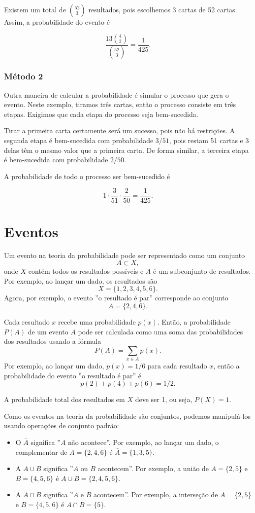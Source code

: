 Existem um total de ${52 \choose 3}$ resultados,
pois escolhemos 3 cartas de 52 cartas.
Assim, a probabilidade do evento é

\[\frac{13 {4 \choose 3}}{{52 \choose 3}} = \frac{1}{425}.\]

\subsubsection*{Método 2}

Outra maneira de calcular a probabilidade é
simular o processo que gera o evento.
Neste exemplo, tiramos três cartas, então o processo
consiste em três etapas.
Exigimos que cada etapa do processo seja bem-sucedida.

Tirar a primeira carta certamente será um sucesso,
pois não há restrições.
A segunda etapa é bem-sucedida com probabilidade $3/51$,
pois restam 51 cartas e 3 delas
têm o mesmo valor que a primeira carta.
De forma similar, a terceira etapa é bem-sucedida com probabilidade $2/50$.

A probabilidade de todo o processo ser bem-sucedido é

\[1 \cdot \frac{3}{51} \cdot \frac{2}{50} = \frac{1}{425}.\]

\section{Eventos}

Um evento na teoria da probabilidade pode ser representado como um conjunto
\[A \subset X,\]
onde $X$ contém todos os resultados possíveis
e $A$ é um subconjunto de resultados.
Por exemplo, ao lançar um dado, os resultados são
\[X = \{1,2,3,4,5,6\}.\]
Agora, por exemplo, o evento ''o resultado é par''
corresponde ao conjunto
\[A = \{2,4,6\}.\]

Cada resultado $x$ recebe uma probabilidade $p(x)$.
Então, a probabilidade $P(A)$ de um evento
$A$ pode ser calculada como uma soma
das probabilidades dos resultados usando a fórmula
\[P(A) = \sum_{x \in A} p(x).\]
Por exemplo, ao lançar um dado,
$p(x)=1/6$ para cada resultado $x$,
então a probabilidade do evento
''o resultado é par'' é
\[p(2)+p(4)+p(6)=1/2.\]

A probabilidade total dos resultados em $X$ deve
ser 1, ou seja, $P(X)=1$.

Como os eventos na teoria da probabilidade são conjuntos,
podemos manipulá-los usando operações de conjunto padrão:

\begin{itemize}
\item O  $\bar A$ significa
''$A$ não acontece''.
Por exemplo, ao lançar um dado,
o complementar de $A=\{2,4,6\}$ é
$\bar A = \{1,3,5\}$.
\item A  $A \cup B$ significa
''$A$ ou $B$ acontecem''.
Por exemplo, a união de
$A=\{2,5\}$
e $B=\{4,5,6\}$ é
$A \cup B = \{2,4,5,6\}$.
\item A  $A \cap B$ significa
''$A$ e $B$ acontecem''.
Por exemplo, a interseção de
$A=\{2,5\}$ e $B=\{4,5,6\}$ é
$A \cap B = \{5\}$.
\end{itemize}

